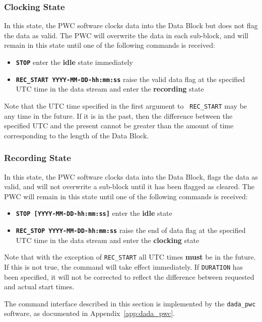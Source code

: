\subsubsection{Clocking State}

In this state, the PWC software clocks data into the Data Block but
does not flag the data as valid.  The PWC will overwrite the data in
each sub-block, and will remain in this state until one of the
following commands is received:
\begin{itemize}
\item {\tt\bf STOP} enter the {\bf idle} state immediately
\item {\tt\bf REC\_START YYYY-MM-DD-hh:mm:ss} raise the valid data flag
	at the specified UTC time in the data stream and enter the {\bf
	recording} state
\end{itemize}
Note that the UTC time specified in the first argument to {\tt
REC\_START} may be any time in the future.  If it is in the past, then
the difference between the specified UTC and the present cannot be
greater than the amount of time corresponding to the length of the
Data Block.

\subsubsection{Recording State}

In this state, the PWC software clocks data into the Data Block, flags
the data as valid, and will not overwrite a sub-block until it has
been flagged as cleared.  The PWC will remain in this state until one
of the following commands is received:
\begin{itemize}
\item {\tt\bf STOP [YYYY-MM-DD-hh:mm:ss]} enter the {\bf idle} state
\item {\tt\bf REC\_STOP YYYY-MM-DD-hh:mm:ss} raise the end of data flag
	at the specified UTC time in the data stream and enter the {\bf
	clocking} state
\end{itemize}

Note that with the exception of {\tt REC\_START} all UTC times {\bf
must} be in the future.  If this is not true, the command will take
effect immediately.  If {\tt DURATION} has been specified, it will not
be corrected to reflect the difference between requested and actual
start times.

The command interface described in this section is implemented by the
{\tt dada\_pwc} software, as documented in Appendix~\ref{app:dada_pwc}.

